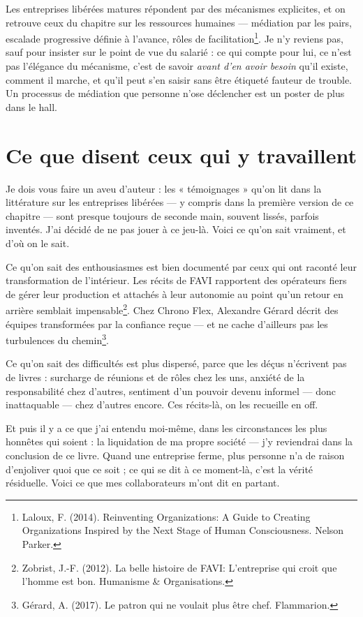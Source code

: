Les entreprises libérées matures répondent par des mécanismes explicites, et on retrouve ceux du chapitre sur les ressources humaines — médiation par les pairs, escalade progressive définie à l'avance, rôles de facilitation\footnote{Laloux, F. (2014). Reinventing Organizations: A Guide to Creating Organizations Inspired by the Next Stage of Human Consciousness. Nelson Parker.}. Je n'y reviens pas, sauf pour insister sur le point de vue du salarié : ce qui compte pour lui, ce n'est pas l'élégance du mécanisme, c'est de savoir \emph{avant d'en avoir besoin} qu'il existe, comment il marche, et qu'il peut s'en saisir sans être étiqueté fauteur de trouble. Un processus de médiation que personne n'ose déclencher est un poster de plus dans le hall.

\section{Ce que disent ceux qui y travaillent}

Je dois vous faire un aveu d'auteur : les « témoignages » qu'on lit dans la littérature sur les entreprises libérées — y compris dans la première version de ce chapitre — sont presque toujours de seconde main, souvent lissés, parfois inventés. J'ai décidé de ne pas jouer à ce jeu-là. Voici ce qu'on sait vraiment, et d'où on le sait.

Ce qu'on sait des enthousiasmes est bien documenté par ceux qui ont raconté leur transformation de l'intérieur. Les récits de FAVI rapportent des opérateurs fiers de gérer leur production et attachés à leur autonomie au point qu'un retour en arrière semblait impensable\footnote{Zobrist, J.-F. (2012). La belle histoire de FAVI: L'entreprise qui croit que l'homme est bon. Humanisme \& Organisations.}. Chez Chrono Flex, Alexandre Gérard décrit des équipes transformées par la confiance reçue — et ne cache d'ailleurs pas les turbulences du chemin\footnote{Gérard, A. (2017). Le patron qui ne voulait plus être chef. Flammarion.}.

Ce qu'on sait des difficultés est plus dispersé, parce que les déçus n'écrivent pas de livres : surcharge de réunions et de rôles chez les uns, anxiété de la responsabilité chez d'autres, sentiment d'un pouvoir devenu informel — donc inattaquable — chez d'autres encore. Ces récits-là, on les recueille en off.

Et puis il y a ce que j'ai entendu moi-même, dans les circonstances les plus honnêtes qui soient : la liquidation de ma propre société — j'y reviendrai dans la conclusion de ce livre. Quand une entreprise ferme, plus personne n'a de raison d'enjoliver quoi que ce soit ; ce qui se dit à ce moment-là, c'est la vérité résiduelle. Voici ce que mes collaborateurs m'ont dit en partant.

